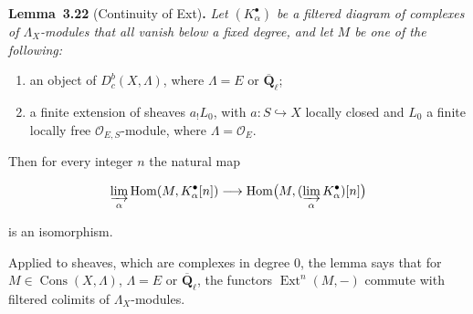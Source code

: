 \documentclass[11pt]{article}
\newenvironment{bpstatement}[2]{\par\addvspace{0.6\baselineskip}\noindent\textbf{#1}#2\textbf{.}\enspace\ignorespaces}
  {\par\addvspace{0.4\baselineskip}}
\newenvironment{bpstatementit}[2]{\begin{bpstatement}{#1}{#2}\itshape\ignorespaces}{\end{bpstatement}}
\providecommand{\Cons}{}\renewcommand{\Cons}{\operatorname{Cons}}
\providecommand{\Dbc}{}\renewcommand{\Dbc}{D^b_c}
\providecommand{\Ext}{}\renewcommand{\Ext}{\operatorname{Ext}}
\providecommand{\Hom}{}\renewcommand{\Hom}{\operatorname{Hom}}
\begin{document}
\label{bp260}%
\begin{bpstatementit}{Lemma~3.22}{ (Continuity of Ext)}
Let \((K_\alpha^\bullet)\) be a filtered diagram of complexes of \(\Lambda_X\)-modules that all vanish below a fixed degree, and let \(M\) be one of the following:

\begin{enumerate}
\item an object of \(\Dbc(X,\Lambda)\), where \(\Lambda=E\) or \(\overline{\mathbf Q}_\ell\);
\item a finite extension of sheaves \(a_!L_0\), with \(a:S\hookrightarrow X\) locally closed and \(L_0\) a finite locally free \(\mathcal O_{E,S}\)-module, where \(\Lambda=\mathcal O_E\).
\end{enumerate}

Then for every integer \(n\) the natural map

\[
\varinjlim_\alpha\Hom(M,K_\alpha^\bullet[n])
\longrightarrow
\Hom\bigl(M,(\varinjlim_\alpha K_\alpha^\bullet)[n]\bigr)
\]

is an isomorphism.
\end{bpstatementit}

\label{bp261}%
Applied to sheaves, which are complexes in degree \(0\), the lemma says that for \(M\in\Cons(X,\Lambda)\), \(\Lambda=E\) or \(\overline{\mathbf Q}_\ell\), the functors \(\Ext^n(M,-)\) commute with filtered colimits of \(\Lambda_X\)-modules.
\end{document}
